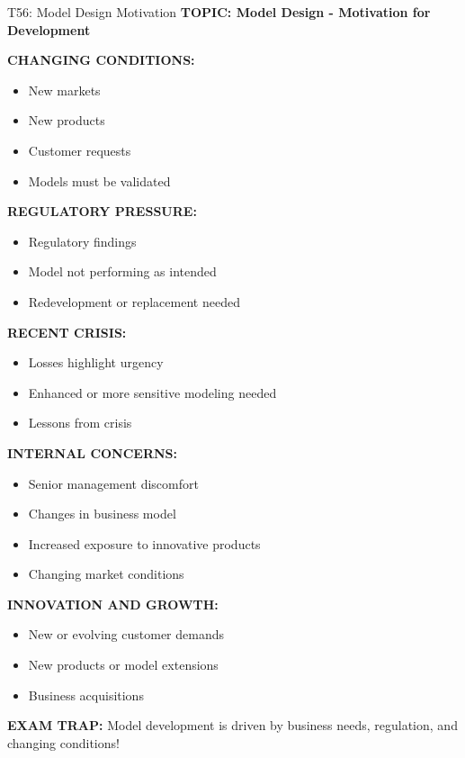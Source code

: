 \documentclass[8pt]{beamer}
\begin{document}
	\begin{frame}{T56: Model Design Motivation}
		\fontsize{6.5}{7.5}\selectfont
		\textbf{TOPIC: Model Design - Motivation for Development}
		
		\vspace{0.1cm}
		\textbf{CHANGING CONDITIONS:}
		\begin{itemize}
			\item New markets
			\item New products
			\item Customer requests
			\item Models must be validated
		\end{itemize}
		
		\vspace{0.1cm}
		\textbf{REGULATORY PRESSURE:}
		\begin{itemize}
			\item Regulatory findings
			\item Model not performing as intended
			\item Redevelopment or replacement needed
		\end{itemize}
		
		\vspace{0.1cm}
		\textbf{RECENT CRISIS:}
		\begin{itemize}
			\item Losses highlight urgency
			\item Enhanced or more sensitive modeling needed
			\item Lessons from crisis
		\end{itemize}
		
		\vspace{0.1cm}
		\textbf{INTERNAL CONCERNS:}
		\begin{itemize}
			\item Senior management discomfort
			\item Changes in business model
			\item Increased exposure to innovative products
			\item Changing market conditions
		\end{itemize}
		
		\vspace{0.1cm}
		\textbf{INNOVATION AND GROWTH:}
		\begin{itemize}
			\item New or evolving customer demands
			\item New products or model extensions
			\item Business acquisitions
		\end{itemize}
		
		\textcolor{myred}{\textbf{EXAM TRAP:}} Model development is driven by \textcolor{myblue}{business needs, regulation, and changing conditions}!
	\end{frame}
	
\end{document}
